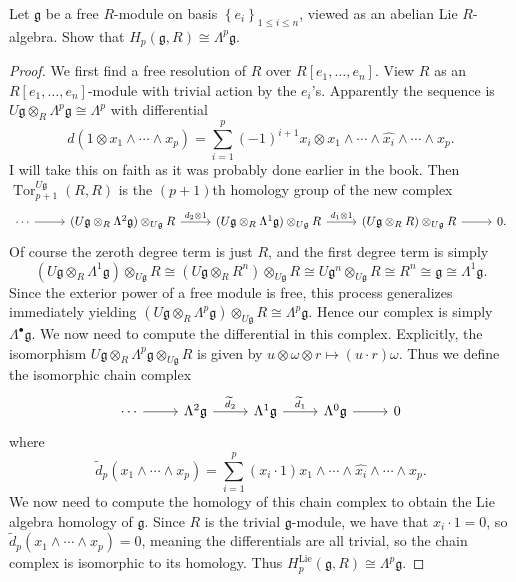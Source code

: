 \begin{exercise}
	Let $\mathfrak{g} $ be a free $R$-module on basis $\left\{ e_i \right\} _{1\leq i\leq n} $, viewed as an abelian Lie $R$-algebra. Show that $H_p(\mathfrak{g} ,R)\cong \Lambda ^p\mathfrak{g} $.
\end{exercise}
\begin{proof}
	We first find a free resolution of $R$ over $R[e_1, \ldots ,e_n]$. View $R$ as an $R[e_1, \ldots ,e_n]$-module with trivial action by the $e_i$'s. Apparently the sequence is $U\mathfrak{g} \otimes_R \Lambda ^p\mathfrak{g} \cong \Lambda ^p$ with differential
	\[
		d(1\otimes x_1 \wedge \cdots \wedge x_{p} ) = \sum_{i=1}^{p} (-1)^{i+1} x_i\otimes  x_1 \wedge \cdots \wedge \widehat{x_i}\wedge \cdots \wedge x_{p} 
	.\]
	I will take this on faith as it was probably done earlier in the book. Then $\operatorname{Tor}_{p+1}^{U\mathfrak{g} } (R,R)$ is the $(p+1)$th homology group of the new complex
	\[\begin{tikzcd}[row sep = 2.5em, column sep = 2.5em]
		\cdots \ar[r]  & (U\mathfrak{g} \otimes _R\Lambda ^2\mathfrak{g} )\otimes_{U\mathfrak{g} } R\ar[" d_2\otimes 1 ", r]  & (U\mathfrak{g} \otimes _R\Lambda ^1\mathfrak{g} )\otimes _{U\mathfrak{g} } R\ar[" d_1\otimes 1 ", r]  & (U\mathfrak{g} \otimes _RR)\otimes _{U\mathfrak{g} } R\ar[r] & 0.
	\end{tikzcd}\]
	Of course the zeroth degree term is just $R$, and the first degree term is simply
	\[
		(U\mathfrak{g} \otimes _R\Lambda ^1\mathfrak{g} )\otimes _{U\mathfrak{g}} R \cong (U\mathfrak{g}  \otimes_R R^n)\otimes_{U\mathfrak{g} } R \cong U\mathfrak{g} ^n \otimes _{U\mathfrak{g} } R \cong R^n\cong \mathfrak{g} \cong \Lambda ^1\mathfrak{g} 
	.\]
	Since the exterior power of a free module is free, this process generalizes immediately yielding $(U\mathfrak{g} \otimes _R\Lambda ^p\mathfrak{g} )\otimes _{U\mathfrak{g} } R \cong \Lambda ^p\mathfrak{g} $. Hence our complex is simply $\Lambda ^{\bullet} \mathfrak{g} $. We now need to compute the differential in this complex. Explicitly, the isomorphism $U\mathfrak{g} \otimes _R\Lambda ^p\mathfrak{g} \otimes _{U\mathfrak{g} } R$ is given by $u\otimes \omega \otimes r\mapsto (u\cdot r)\omega $. Thus we define the isomorphic chain complex
	\[\begin{tikzcd}[row sep = 2.5em, column sep = 2.5em]
		\cdots \ar[r]  & \Lambda ^2\mathfrak{g}  \ar[" \widetilde{d}_2 ", r]  & \Lambda ^1\mathfrak{g} \ar[" \widetilde{d} _1 ", r]  & \Lambda ^0\mathfrak{g} \ar[r] & 0
	\end{tikzcd}\]
	where
	\[
		\widetilde{d}_p(x_1 \wedge \cdots \wedge x_p) = \sum_{i=1}^{p} (x_i \cdot 1)x_1 \wedge \cdots \wedge \widehat{x_i}\wedge \cdots \wedge x_p
	.\]
	We now need to compute the homology of this chain complex to obtain the Lie algebra homology of $\mathfrak{g} $. Since $R$ is the trivial $\mathfrak{g} $-module, we have that $x_i\cdot 1=0$, so $\widetilde{d} _p(x_1 \wedge \cdots \wedge x_p)=0$, meaning the differentials are all trivial, so the chain complex is isomorphic to its homology. Thus $H_{p} ^{\mathrm{Lie} } (\mathfrak{g} ,R)\cong \Lambda ^p\mathfrak{g} $.
\end{proof}


